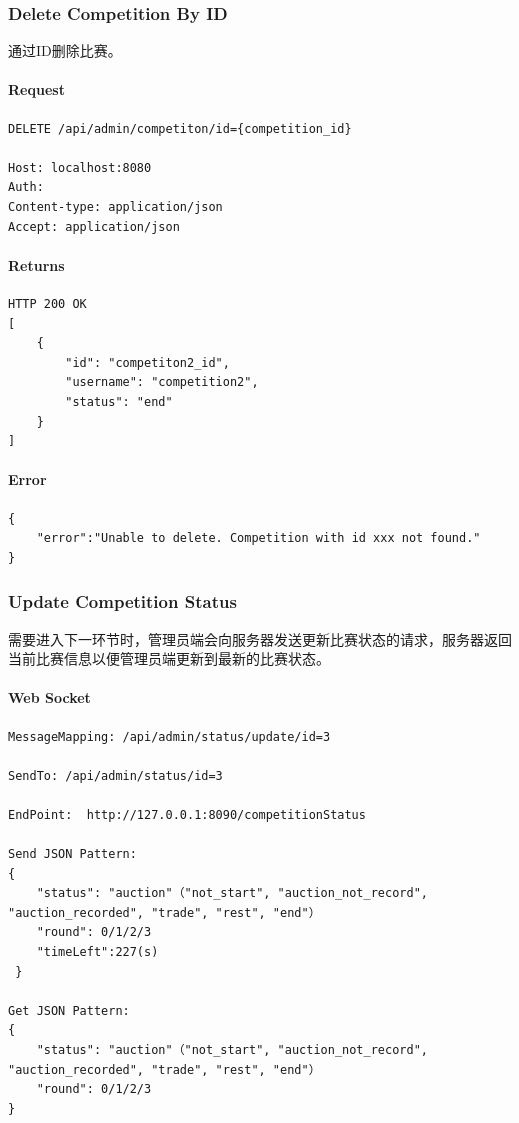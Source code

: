 \documentclass{article}
\begin{document}
\subsubsection{Delete Competition By ID}

通过ID删除比赛。

\paragraph*{Request}
\begin{lstlisting}
DELETE /api/admin/competiton/id={competition_id}

Host: localhost:8080
Auth:
Content-type: application/json
Accept: application/json
\end{lstlisting}

\paragraph*{Returns}
\begin{lstlisting}
HTTP 200 OK
[
    {
        "id": "competiton2_id",
        "username": "competition2",
        "status": "end"
    }
]
\end{lstlisting}

\paragraph*{Error}
\begin{lstlisting}
{
    "error":"Unable to delete. Competition with id xxx not found."
}
\end{lstlisting}

\subsubsection{Update Competition Status}

需要进入下一环节时，管理员端会向服务器发送更新比赛状态的请求，服务器返回当前比赛信息以便管理员端更新到最新的比赛状态。

\paragraph*{Web Socket}
\begin{lstlisting}
MessageMapping: /api/admin/status/update/id=3

SendTo: /api/admin/status/id=3

EndPoint:  http://127.0.0.1:8090/competitionStatus

Send JSON Pattern:
{
    "status": "auction"（"not_start", "auction_not_record", "auction_recorded", "trade", "rest", "end"）
    "round": 0/1/2/3
    "timeLeft":227(s)
 }

Get JSON Pattern:
{
    "status": "auction"（"not_start", "auction_not_record", "auction_recorded", "trade", "rest", "end"）
    "round": 0/1/2/3
}
\end{lstlisting}
\end{document}
